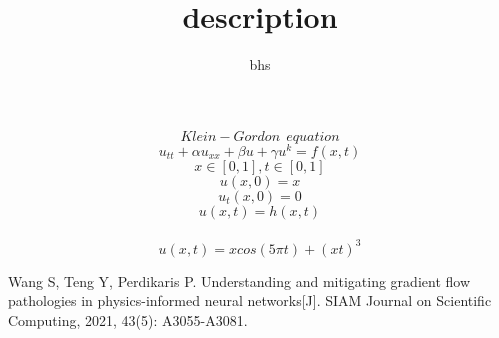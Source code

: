 \documentclass[12pt]{amsart}
\title{description}
\author{bhs}
\begin{document}
\maketitle

$$Klein-Gordon \ \ equation$$
$$u_{tt}+\alpha u_{xx}+\beta u + \gamma u^{k} = f(x,t)$$
$$x\in [0,1] ,t \in [0,1]$$
$$u(x,0) = x$$
$$u_{t}(x,0) = 0$$
$$u(x,t)=h(x,t)$$\\
$$u(x,t) = xcos(5\pi t)+(xt)^{3}$$


\begin{thebibliography}{10}
Wang S, Teng Y, Perdikaris P. Understanding and mitigating gradient flow pathologies in physics-informed neural networks[J]. SIAM Journal on Scientific Computing, 2021, 43(5): A3055-A3081.
\end{thebibliography}
\end{document}
